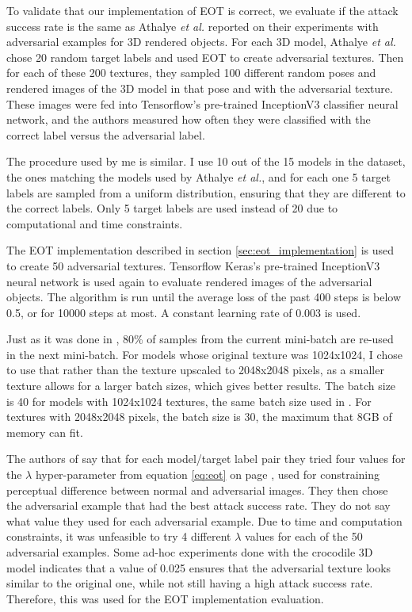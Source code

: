 To validate that our implementation of EOT is correct, we evaluate if the attack success rate is the same as Athalye \textit{et al.} \cite{athalye} reported on their experiments with adversarial examples for 3D rendered objects. For each 3D model, Athalye \textit{et al.} chose 20 random target labels and used EOT to create adversarial textures. Then for each of these 200 textures, they sampled 100 different random poses and rendered images of the 3D model in that pose and with the adversarial texture. These images were fed into Tensorflow's pre-trained InceptionV3 classifier neural network, and the authors measured how often they were classified with the correct label versus the adversarial label.

The procedure used by me is similar. I use 10 out of the 15 models in the dataset, the ones matching the models used by Athalye \textit{et al.}, and for each one 5 target labels are sampled from a uniform distribution, ensuring that they are different to the correct labels. Only 5 target labels are used instead of 20 due to computational and time constraints.

The EOT implementation described in section \ref{sec:eot_implementation} is used to create 50 adversarial textures.  Tensorflow Keras's pre-trained InceptionV3 neural network is used again to evaluate rendered images of the adversarial objects. The algorithm is run until the average loss of the past 400 steps is below 0.5, or for 10000 steps at most. A constant learning rate of 0.003 is used. 

Just as it was done in \cite{athalye}, 80\% of samples from the current mini-batch are re-used in the next mini-batch. For models whose original texture was 1024x1024, I chose to use that rather than the texture upscaled to 2048x2048 pixels, as a smaller texture allows for a larger batch sizes, which gives better results. The batch size is 40 for models with 1024x1024 textures, the same batch size used in \cite{athalye}. For textures with 2048x2048 pixels, the batch size is 30, the maximum that 8GB of memory can fit. 

The authors of \cite{athalye} say that for each model/target label pair they tried four values for the $\lambda$ hyper-parameter from equation \ref{eq:eot} on page \pageref{eq:eot}, used for constraining perceptual difference between normal and adversarial images. They then chose the adversarial example that had the best attack success rate. They do not say what value they used for each adversarial example. Due to time and computation constraints, it was unfeasible to try 4 different $\lambda$ values for each of the 50 adversarial examples. Some ad-hoc experiments done with the crocodile 3D model indicates that a value of 0.025 ensures that the adversarial texture looks similar to the original one, while not still having a high attack success rate. Therefore, this was used for the EOT implementation evaluation.

